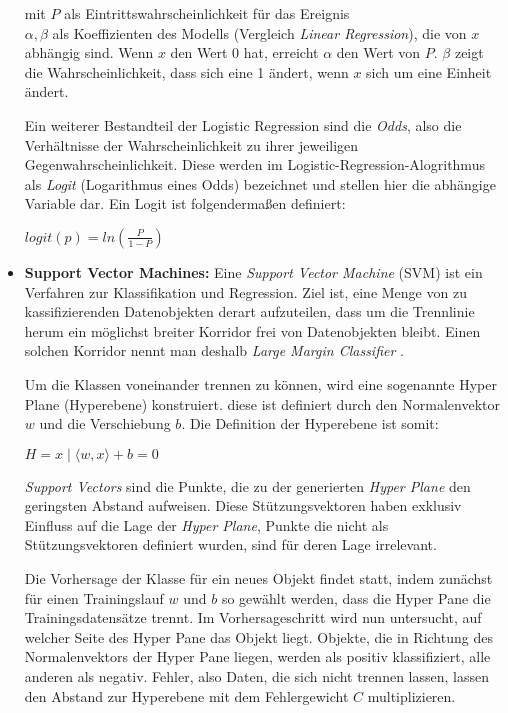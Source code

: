 \begin{itemize}
mit \(P\) als Eintrittswahrscheinlichkeit für das Ereignis \\
\(\alpha, \beta\) als Koeffizienten des Modells (Vergleich \textit{Linear Regression}), die von \(x\) abhängig sind. Wenn \(x\) den Wert 0 hat, erreicht \(\alpha\) den Wert von \(P\). \(\beta\) zeigt die Wahrscheinlichkeit, dass sich eine 1 ändert, wenn \(x\) sich um eine Einheit ändert.

Ein weiterer Bestandteil der Logistic Regression sind die \textit{Odds}, also die Verhältnisse der Wahrscheinlichkeit zu ihrer jeweiligen Gegenwahrscheinlichkeit. Diese werden im Logistic-Regression-Alogrithmus als \textit{Logit} (Logarithmus eines Odds) bezeichnet und stellen hier die abhängige Variable dar. 
Ein Logit ist folgendermaßen definiert: 

\(logit(p) = ln( \frac{P}{1-P})\)

\item \textbf{Support Vector Machines:} Eine \textit{Support Vector Machine} (SVM) ist ein Verfahren zur Klassifikation und Regression. Ziel ist, eine Menge von zu kassifizierenden Datenobjekten derart aufzuteilen, dass um die Trennlinie herum ein möglichst breiter Korridor frei von Datenobjekten bleibt. Einen solchen Korridor nennt man deshalb \textit{Large Margin Classifier} .

Um die Klassen voneinander trennen zu können, wird eine sogenannte Hyper Plane (Hyperebene) konstruiert. diese ist definiert durch den Normalenvektor \(w\) und die Verschiebung \(b\). Die Definition der Hyperebene ist somit: 

\(H = {x \mid \langle w,x \rangle+b=0}\)

\textit{Support Vectors} sind die Punkte, die zu der generierten \textit{Hyper Plane} den geringsten Abstand aufweisen. Diese Stützungsvektoren haben exklusiv Einfluss auf die Lage der \textit{Hyper Plane}, Punkte die nicht als Stützungsvektoren definiert wurden, sind für deren Lage irrelevant.  

Die Vorhersage der Klasse für ein neues Objekt findet statt, indem zunächst für einen Trainingslauf \(w\) und \(b\) so gewählt werden, dass die Hyper Pane die Trainingsdatensätze trennt. Im Vorhersageschritt wird nun untersucht, auf welcher Seite des Hyper Pane das Objekt liegt. Objekte, die in Richtung des Normalenvektors der Hyper Pane liegen, werden als positiv klassifiziert, alle anderen als negativ. Fehler, also Daten, die sich nicht trennen lassen, lassen den Abstand zur Hyperebene mit dem Fehlergewicht \(C\) multiplizieren.  


\end{itemize}
